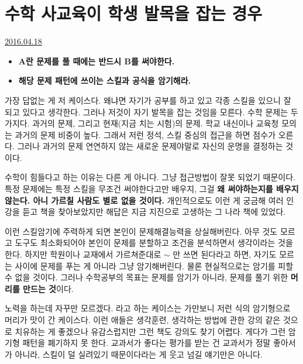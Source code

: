 \section{수학 사교육이 학생 발목을 잡는 경우}
\href{https://www.kockoc.com/Apoc/734042}{2016.04.18}

\vspace{5mm}

\begin{itemize}
    \item[] \textbf{A란 문제를 풀 때에는 반드시 B를 써야한다.}
    \item[] \textbf{해당 문제 패턴에 쓰이는 스킬과 공식을 암기해라.}
\end{itemize}
가장 답없는 게 저 케이스다. 
왜냐면 자기가 공부를 하고 있고 각종 스킬을 있으니 잘 되고 있다고 생각한다.   
그러나 저것이 자기 발목을 잡는 것임을 모른다.   
수학 문제는 두가지다. 과거의 문제, 그리고 현재(지금 치는 시험)의 문제.   
학교 내신이나 교육청 모의는 과거의 문제 비중이 높다.
그래서 저런 정석, 스킬 중심의 접근을 하면 점수가 오른다.
그러나 과거의 문제 연연하지 않는 새로운 문제야말로 자신의 운명을 결정하는 것이다.
\vspace{5mm}

수학이 힘들다고 하는 이유는 다른 게 아니다.
그냥 접근방법이 잘못 되었기 때문이다.
특정 문제에는 특정 스킬을 무조건 써야한다고만 배우지, 그걸 \textbf{왜 써야하는지를 배우지 않는다. 아니 가르칠 사람도 별로 없을 것이다.}   
개인적으로도 이런 게 궁금해 여러 인강을 듣고 책을 찾아보았지만 해답은 지금 지진으로 고생하는 그 나라 책에 있었다.
\vspace{5mm}

이런 스킬암기에 주력하게 되면 본인이 문제해결능력을 상실해버린다.
아무 것도 모르고 도구도 최소화되어야 본인이 문제를 분할하고 조건을 분석하면서 생각이라는 것을 한다.
하지만 학원이나 교재에서 가르쳐준대로 $\sim$ 만 쓰면 된다라고 하면, 자기도 모르는 사이에 문제를 푸는 게 아니라 그냥 암기해버린다.
물론 현실적으로는 암기를 피할 수 없을 것이다.
그러나 수학공부의 목표는 문제를 암기가 아니라, 문제를 풀기 위한 \textbf{머리를 만드는 것}이다.
\vspace{5mm}

노력을 하는데 자꾸만 모르겠다. 라고 하는 케이스는 가만보니 저런 식의 암기형으로 머리가 맛이 간 케이스다.   
이런 애들은 생각훈련, 생각하는 방법에 관한 강의 같은 것으로 치유하는 게 좋겠으나 유감스럽지만 그런 책도 강의도 찾기 어렵다.   
게다가 그런 암기형 패턴을 폐기하지 못 한다.   
교과서가 좋다는 평가를 받는 건 교과서가 정말 좋아서가 아니라, 스킬이 덜 실려있기 때문이다라는 게 웃고 넘길 얘기만은 아니다.






